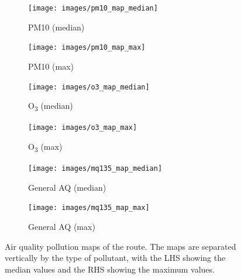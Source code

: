 \documentclass[11pt,twosided,a4paper]{report}
\begin{document}
\begin{figure}[!tbp]
    \centering
    \begin{minipage}{1\linewidth}
            \begin{subfigure}[t]{.5\linewidth}
                \texttt{[image: images/pm10\_map\_median]}
                \caption{PM10 (median)}
                \label{fig:pm10_map_median}
            \end{subfigure}
            \begin{subfigure}[t]{.5\linewidth}
            	\texttt{[image: images/pm10\_map\_max]}
            	\caption{PM10 (max)}
            	\label{fig:pm10_map_max}
	   \end{subfigure}
        \end{minipage}
    \begin{minipage}{1\linewidth}
            \begin{subfigure}[t]{.5\linewidth}
                \texttt{[image: images/o3\_map\_median]}
                \caption{O\textsubscript{3} (median)}
                \label{fig:o3_map_median}
            \end{subfigure}
            \begin{subfigure}[t]{.5\linewidth}
            	\texttt{[image: images/o3\_map\_max]}
            	\caption{O\textsubscript{3} (max)}
            	\label{fig:o3_map_max}
	   \end{subfigure}
        \end{minipage}
    \begin{minipage}{1\linewidth}
            \begin{subfigure}[t]{.5\linewidth}
                \texttt{[image: images/mq135\_map\_median]}
                \caption{General AQ (median)}
                \label{fig:mq135_map_median}
            \end{subfigure}
            \begin{subfigure}[t]{.5\linewidth}
            	\texttt{[image: images/mq135\_map\_max]}
            	\caption{General AQ (max)}
            	\label{fig:mq135_map_max}
	   \end{subfigure}
        \end{minipage}
    \caption[Air quality pollution maps of the route.]{Air quality pollution maps of the route. The maps are separated vertically by the type of pollutant, with the LHS showing the median values and the RHS showing the maximum values.}
    \label{fig:route_pollution_maps}
\end{figure}
\end{document}
